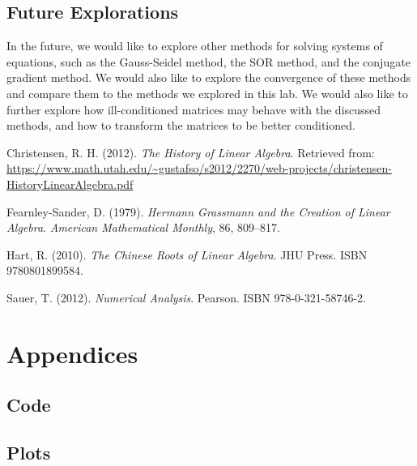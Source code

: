 \documentclass[11pt]{article}
\begin{document}
\subsection{Future Explorations}

In the future, we would like to explore other methods for solving systems of equations, such as the Gauss-Seidel method, the SOR method, and the conjugate gradient method. We would also like to explore the convergence of these methods and compare them to the methods we explored in this lab. We would also like to further explore how ill-conditioned matrices may behave with the discussed methods, and how to transform the matrices to be better conditioned.

\begin{thebibliography}{}
  Christensen, R. H. (2012).
  \textit{The History of Linear Algebra}.
  Retrieved from: \url{https://www.math.utah.edu/~gustafso/s2012/2270/web-projects/christensen-HistoryLinearAlgebra.pdf}
  
  Fearnley-Sander, D. (1979).
  \textit{Hermann Grassmann and the Creation of Linear Algebra}.
  \textit{American Mathematical Monthly}, 86, 809–817.
  
  Hart, R. (2010).
  \textit{The Chinese Roots of Linear Algebra}.
  JHU Press. ISBN 9780801899584.
  
  Sauer, T. (2012).
  \textit{Numerical Analysis}.
  Pearson. ISBN 978-0-321-58746-2.
\end{thebibliography}
  

\section{Appendices}

\subsection{Code}





\subsection{Plots}
\end{document}

